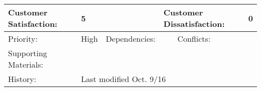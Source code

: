 \documentclass[11pt]{article}
\begin{document}
\begin{tabular}{|l|l|l|l|l|l|}
Customer Satisfaction:          & \multicolumn{2}{l|}{5}                                             & \multicolumn{2}{l|}{Customer Dissatisfaction:}                 & 0                       \\ \hline
Priority:                       & High                      & Dependencies:                          &                          & Conflicts:                          &                         \\ \hline
Supporting Materials:           & \multicolumn{5}{l|}{}                                                                                                                                         \\ \hline
History:                        & \multicolumn{5}{l|}{Last modified Oct. 9/16}                                                                                                                  \\ \hline
\end{tabular}


\vspace{10 mm}
\end{document}
